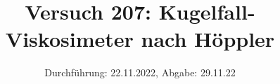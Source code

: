 

\title{Versuch 207: Kugelfall-Viskosimeter nach Höppler}
\date{Durchführung: 22.11.2022, Abgabe: 29.11.22}



\maketitle

\tableofcontents
\newpage












%






\printbibliography



